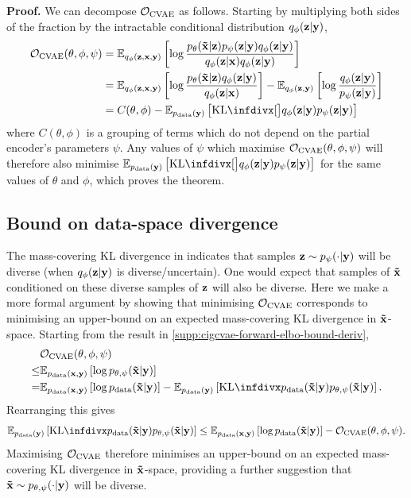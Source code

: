 \textbf{Proof.} We can decompose ${\mathcal{O}}_\text{CVAE}$ as follows.
Starting by multiplying both sides of the fraction by the intractable
conditional distribution $q_\phi({\mathbf{z}}|{\mathbf{y}})$,
\begin{align}
  \gO_\text{CVAE}(\theta, \phi, \psi ) &= \EX_{q_\phi(\rvz,\rvx,\rvy)} \left[ \log \frac{p_\theta(\tildeI{}|\rvz)p_\psi(\rvz|\rvy)q_\phi(\rvz|\rvy)}{q_\phi(\rvz|\rvx)q_\phi(\rvz|\rvy)} \right]\\
                                                   &= \EX_{q_\phi(\rvz,\rvx,\rvy)} \left[ \log \frac{p_\theta(\tildeI{}|\rvz)q_\phi(\rvz|\rvy)}{q_\phi(\rvz|\rvx)} \right] - \EX_{q_\phi(\rvz,\rvy)} \left[ \log\frac{q_\phi(\rvz|\rvy)}{p_\psi(\rvz|\rvy)} \right] \\
                                                   &= C(\theta, \phi) - \EX_{\pdata (\rvy)} \left[ \kl[\big]{ q_\phi(\rvz|\rvy) }{ p_\psi(\rvz|\rvy) } \right]   \label{eq:constant-and-forward-kl}
\end{align}
where $C(\theta, \phi)$ is a grouping of terms which do not depend on the
partial encoder's parameters $\psi $. Any values of $\psi$ which
maximise ${\mathcal{O}}_\text{CVAE}(\theta, \phi, \psi)$ will therefore also
minimise $\EX_{\pdata (\rvy)} \left[ \kl[\big]{ q_\phi(\rvz|\rvy) }{p_\psi(\rvz|\rvy) } \right]$ for the same values of $\theta$ and $\phi$,
which proves the theorem.

\subsection{Bound on data-space divergence}
The mass-covering KL divergence in  indicates that
samples ${\mathbf{z}}\sim p_\psi(\cdot|{\mathbf{y}})$ will be diverse (when $q_\phi({\mathbf{z}}|{\mathbf{y}})$ is
diverse/uncertain). One would expect that samples of $\mathbf{\tilde{x}}{}$ conditioned on these
diverse samples of ${\mathbf{z}}$ will also be diverse. Here we make a more formal argument
by showing that minimising ${\mathcal{O}}_\text{CVAE}$ corresponds to minimising
an upper-bound on an expected mass-covering KL divergence in $\mathbf{\tilde{x}}{}$-space.
Starting from the result in \cref{supp:cigcvae-forward-elbo-bound-deriv},
\begin{align}
  &\gO_\text{CVAE}(\theta, \phi, \psi ) \\
  \leq &\EX_{\pdata (\rvx,\rvy)} \left[ \log p_{\theta,\psi}(\tildeI{}|\rvy) \right] \\
  = &\EX_{\pdata (\rvx,\rvy)} \left[ \log \pdata (\tildeI{}|\rvy) \right] - \EX_{\pdata (\rvy)}\left[ \kl{\pdata (\tildeI{}|\rvy)}{p_{\theta,\psi}(\tildeI{}|\rvy)} \right].
\end{align}
Rearranging this gives
\begin{align}
  \EX_{\pdata (\rvy)}\left[ \kl{\pdata (\tildeI{}|\rvy)}{p_{\theta,\psi}(\tildeI{}|\rvy)} \right]  \leq \EX_{\pdata (\rvx,\rvy)} \left[ \log \pdata (\tildeI{}|\rvy) \right] - \gO_\text{CVAE}(\theta, \phi, \psi ).
\end{align}
Maximising ${\mathcal{O}}_\text{CVAE}$ therefore minimises an upper-bound on an
expected mass-covering KL divergence in $\mathbf{\tilde{x}}{}$-space, providing a further suggestion that
$\mathbf{\tilde{x}}{}\sim p_{\theta,\psi}(\cdot|{\mathbf{y}})$ will be diverse.

